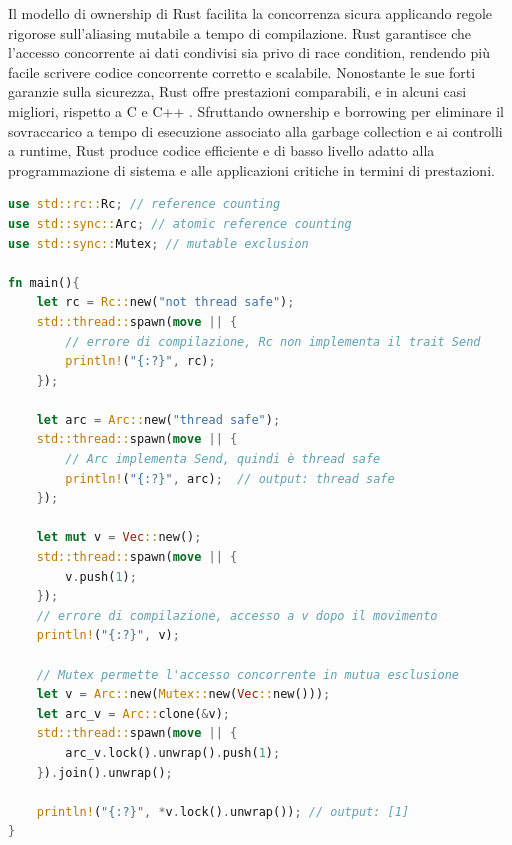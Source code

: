 Il modello di ownership di Rust facilita la concorrenza sicura applicando regole rigorose sull'aliasing mutabile a tempo di compilazione. Rust garantisce che l'accesso concorrente ai dati condivisi sia privo di race condition, rendendo più facile scrivere codice concorrente corretto e scalabile.
Nonostante le sue forti garanzie sulla sicurezza, Rust offre prestazioni comparabili, e in alcuni casi migliori, rispetto a C e C++ \cite[]{Rust:bench}. Sfruttando ownership e borrowing per eliminare il sovraccarico a tempo di esecuzione associato alla garbage collection e ai controlli a runtime, Rust produce codice efficiente e di basso livello adatto alla programmazione di sistema e alle applicazioni critiche in termini di prestazioni.

\vspace{5mm}
\begin{lstlisting}[language=Rust, caption=Fearless concurrency, label=lis:rust_fearless_concurrency]
use std::rc::Rc; // reference counting
use std::sync::Arc; // atomic reference counting
use std::sync::Mutex; // mutable exclusion

fn main(){
    let rc = Rc::new("not thread safe");
    std::thread::spawn(move || {
        // errore di compilazione, Rc non implementa il trait Send
        println!("{:?}", rc); 
    });

    let arc = Arc::new("thread safe");
    std::thread::spawn(move || {
        // Arc implementa Send, quindi è thread safe
        println!("{:?}", arc);  // output: thread safe
    });

    let mut v = Vec::new();
    std::thread::spawn(move || {
        v.push(1); 
    });
    // errore di compilazione, accesso a v dopo il movimento
    println!("{:?}", v); 

    // Mutex permette l'accesso concorrente in mutua esclusione
    let v = Arc::new(Mutex::new(Vec::new())); 
    let arc_v = Arc::clone(&v);
    std::thread::spawn(move || {
        arc_v.lock().unwrap().push(1); 
    }).join().unwrap(); 

    println!("{:?}", *v.lock().unwrap()); // output: [1]
}
\end{lstlisting}
\vspace{5mm}

